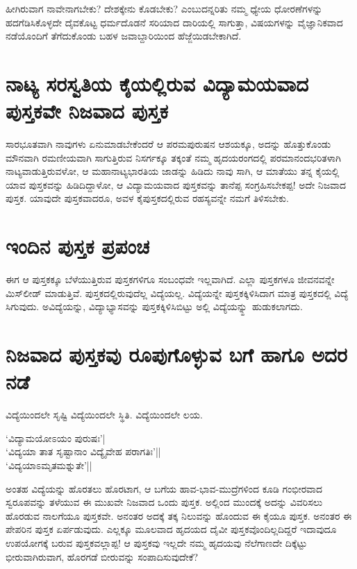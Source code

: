 ಹೀಗಿರುವಾಗ ನಾವೇನಾಗಬೇಕು? ದೇಶಕ್ಕೇನು ಕೊಡಬೇಕು? ಎಂಬುದನ್ನರಿತು ನಮ್ಮ ಧ್ಯೇಯ ಧೋರಣೆಗಳನ್ನು ಹದಗೆಡಿಸಿಕೊಳ್ಳದೇ ದೈವಕೊಟ್ಟ ಧರ್ಮದೊಡನೆ ಸರಿಯಾದ ದಾರಿಯಲ್ಲಿ ಸಾಗುತ್ತಾ, ವಿಷಯಗಳನ್ನು ವೈಜ್ಞಾನಿಕವಾದ ನಡೆಯೊಂದಿಗೆ ತೆಗೆದುಕೊಂಡು ಬಹಳ ಜವಾಬ್ದಾರಿಯಿಂದ ಹೆಜ್ಜೆಯಿಡಬೇಕಾಗಿದೆ.

\section*{ನಾಟ್ಯ ಸರಸ್ವತಿಯ ಕೈಯಲ್ಲಿರುವ ವಿದ್ಯಾಮಯವಾದ ಪುಸ್ತಕವೇ ನಿಜವಾದ ಪುಸ್ತಕ} 

ಸಾರಭೂತವಾಗಿ ನಾವುಗಳು ಏನುಮಾಡಬೇಕೆಂದರೆ ಆ ಪರಮಪುರುಷನ ಆಶಯಕ್ಕೂ, ಅದನ್ನು ಹೊತ್ತುಕೊಂಡು ಮೌನವಾಗಿ ರಮಣೀಯವಾಗಿ ಸಾಗುತ್ತಿರುವ ನಿಸರ್ಗಕ್ಕೂ ತಕ್ಕಂತೆ ನಮ್ಮ ಹೃದಯರಂಗದಲ್ಲಿ ಪರಮಾನಂದಭರಿತಳಾಗಿ ನಾಟ್ಯವಾಡುತ್ತಿರುವಳೋ, ಆ ಮಹಾನಾಟ್ಯಭಾರತಿಯ ಜಾಡನ್ನು ಹಿಡಿದು ನಾವು ಸಾಗಿ, ಆ ಮಾತೆಯು ತನ್ನ ಕೈಯಲ್ಲಿ ಯಾವ ಪುಸ್ತಕವನ್ನು ಹಿಡಿದಿದ್ದಾಳೋ, ಆ ವಿದ್ಯಾಮಯವಾದ ಪುಸ್ತಕವನ್ನು ತಾನೆಪ್ಪ ಸಂಗ್ರಹಿಸಬೇಕಪ್ಪ! ಅದೇ ನಿಜವಾದ ಪುಸ್ತಕ. ಯಾವುದೇ ಪುಸ್ತಕವಾದರೂ, ಅವಳ ಕೈಪುಸ್ತಕದಲ್ಲಿರುವ ರಹಸ್ಯವನ್ನೇ ನಮಗೆ ತಿಳಿಸಬೇಕು.

\section*{ಇಂದಿನ ಪುಸ್ತಕ ಪ್ರಪಂಚ}

ಈಗ ಆ ಪುಸ್ತಕಕ್ಕೂ ಬೆಳೆಯುತ್ತಿರುವ ಪುಸ್ತಕಗಳಿಗೂ ಸಂಬಂಧವೇ ಇಲ್ಲವಾಗಿದೆ. ಎಲ್ಲಾ ಪುಸ್ತಕಗಳೂ ಜೀವನವನ್ನೇ ಮಿಸ್‌ಲೀಡ್ ಮಾಡುತ್ತಿವೆ. ಪುಸ್ತಕದಲ್ಲಿರುವುದೆಲ್ಲ ವಿದ್ಯೆಯಲ್ಲ. ವಿದ್ಯೆಯನ್ನೇ ಪುಸ್ತಕಕ್ಕಿಳಿಸಿದಾಗ ಮಾತ್ರ ಪುಸ್ತಕದಲ್ಲಿ ವಿದ್ಯೆ ಸಿಗುವುದು. ಅವಿದ್ಯೆಯನ್ನು, ವಿದ್ಯಾಭ್ಯಾಸವನ್ನು ಪುಸ್ತಕಕ್ಕಿಳಿಸಿಬಿಟ್ಟು ಅಲ್ಲಿ ವಿದ್ಯೆಯನ್ನ್ಹು ಹುಡುಕಲಾಗದು.

\section*{ನಿಜವಾದ ಪುಸ್ತಕವು ರೂಪುಗೊಳ್ಳುವ ಬಗೆ ಹಾಗೂ ಅದರ ನಡೆ}

ವಿದ್ಯೆಯಿಂದಲೇ ಸೃಷ್ಟಿ ವಿದ್ಯೆಯಿಂದಲೇ ಸ್ಥಿತಿ. ವಿದ್ಯೆಯಿಂದಲೇ ಲಯ.

\begin{shloka}
`ವಿದ್ಯಾಮಯೋಽಯಂ ಪುರುಷಃ'|\label{133b}\\
`ವಿದ್ಯಯಾ ತಾತ ಸೃಷ್ಟಾನಾಂ ವಿದ್ಯೈವೇಹ ಪರಾಗತಿಃ'||\label{133}\\
`ವಿದ್ಯಯಾಽಮೃತಮಶ್ನುತೇ'||\label{133a}
\end{shloka}
ಅಂತಹ ವಿದ್ಯೆಯನ್ನು ಹೊರತಲು ಹೊರಟಾಗ, ಆ ಬಗೆಯ ಹಾವ-ಭಾವ-ಮುದ್ರೆಗಳಿಂದ ಕೂಡಿ ಗಂಭೀರವಾದ ಸ್ವರೂಪವನ್ನು ತಳೆಯುವ ಈ ಮುಖವೇ ನಿಜವಾದ ಒಂದು ಪುಸ್ತಕ. ಅಲ್ಲಿಂದ ಮುಂದಕ್ಕೆ ಅದನ್ನು ವಿವರಿಸಲು ಹೊರಡುವ ನಾಲಗೆಯೂ ಪುಸ್ತಕವೇ. ಅನಂತರ ಅದಕ್ಕೆ ತಕ್ಕ ನಿಲುವನ್ನು ಹೊಂದುವ ಈ ಕೈಯೂ ಪುಸ್ತಕ. ಅನಂತರ ಈ ಪೇಪರಿನ ಪುಸ್ತಕ ಏರ್ಪಡುವುದು. ಎಲ್ಲಕ್ಕೂ ಮೂಲವಾದ ಹೃದಯದ ದೈವೀ ಪುಸ್ತಕವೊಂದಿಲ್ಲದಿದ್ದರೆ ಇದಾವುದೂ ಉಪಯೋಗಕ್ಕೆ ಬರುವ ಪುಸ್ತಕವಲ್ಲಾಪ್ಪ! ಆ ಪುಸ್ತಕವು ಇಲ್ಲದೇ ನಮ್ಮ ಹೃದಯವು ನೆಲೆಗಾಣದೇ ದಿಕ್ಕೆಟ್ಟು ಭೀರುವಾಗಿರುವಾಗ, ಹೊರಗಡೆ ಬೀರುವನ್ನು ಸಂಪಾದಿಸುವುದೇಕೆ?

